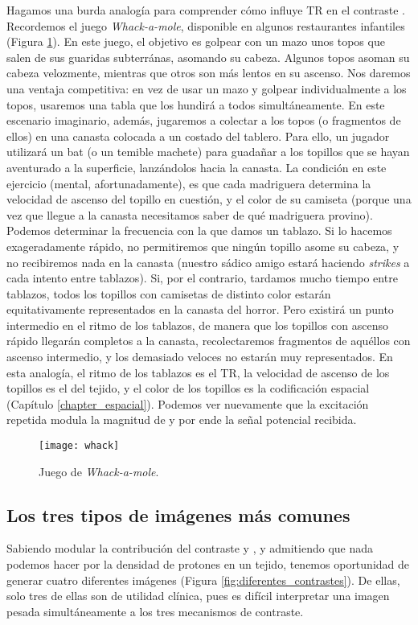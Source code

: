 Hagamos una burda analogía para comprender cómo influye TR en el contraste \Tone. Recordemos el juego \textit{Whack-a-mole}, disponible en algunos restaurantes infantiles (Figura \ref{fig:whack}). En este juego, el objetivo es golpear con un mazo unos topos que salen de sus guaridas subterránas, asomando su cabeza. Algunos topos asoman su cabeza velozmente, mientras que otros son más lentos en su ascenso. Nos daremos una ventaja competitiva: en vez de usar un mazo y golpear individualmente a los topos, usaremos una tabla que los hundirá a todos simultáneamente. En este escenario imaginario, además, jugaremos a colectar a los topos (o fragmentos de ellos) en una canasta colocada a un costado del tablero. Para ello, un jugador utilizará un bat (o un temible machete) para guadañar a los topillos que se hayan aventurado a la superficie, lanzándolos hacia la canasta. La condición en este ejercicio (mental, afortunadamente), es que cada madriguera determina la velocidad de ascenso del topillo en cuestión, y el color de su camiseta (porque una vez que llegue a la canasta necesitamos saber de qué madriguera provino). Podemos determinar la frecuencia con la que damos un tablazo. Si lo hacemos exageradamente rápido, no permitiremos que ningún topillo asome su cabeza, y no recibiremos nada en la canasta (nuestro sádico amigo estará haciendo \textit{strikes} a cada intento entre tablazos). Si, por el contrario, tardamos mucho tiempo entre tablazos, todos los topillos con camisetas de distinto color estarán equitativamente representados en la canasta del horror. Pero existirá un punto intermedio en el ritmo de los tablazos, de manera que los topillos con ascenso rápido llegarán completos a la canasta, recolectaremos fragmentos de aquéllos con ascenso intermedio, y los demasiado veloces no estarán muy representados. En esta analogía, el ritmo de los tablazos es el TR, la velocidad de ascenso de los topillos es el \Tone del tejido, y el color de los topillos es la codificación espacial (Capítulo \ref{chapter_espacial}). Podemos ver nuevamente que la excitación repetida modula la magnitud de \Mz y por ende la señal potencial recibida.


\begin{figure}[htb]
\begin{figg}
   \texttt{[image: whack]}
   \caption{Juego de \textit{Whack-a-mole}.}
 \label{fig:whack}
 \end{figg}
\end{figure}


\subsection{Los tres tipos de imágenes más comunes}
\label{sec:imagenescomunes}
Sabiendo modular la contribución del contraste \Tone y \Ttwo, y admitiendo que nada podemos hacer por la densidad de protones en un tejido, tenemos oportunidad de generar cuatro diferentes imágenes (Figura \ref{fig:diferentes_contrastes}). De ellas, solo tres de ellas son de utilidad clínica, pues es difícil interpretar una imagen pesada simultáneamente a los tres mecanismos de contraste.


